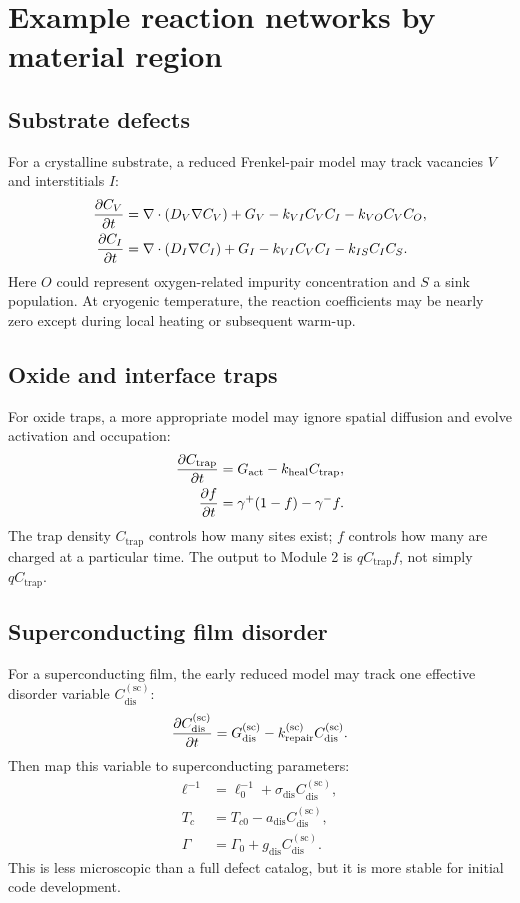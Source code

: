 \documentclass[11pt]{article}
\begin{document}
\section{Example reaction networks by material region}

\subsection{Substrate defects}

For a crystalline substrate, a reduced Frenkel-pair model may track vacancies $V$ and interstitials $I$:
\begin{align}
\pdv{C_V}{t}&=\nabla\cdot(D_V\nabla C_V)+G_V-k_{VI}C_VC_I-k_{VO}C_VC_O,\\
\pdv{C_I}{t}&=\nabla\cdot(D_I\nabla C_I)+G_I-k_{VI}C_VC_I-k_{IS}C_I C_S.
\end{align}
Here $O$ could represent oxygen-related impurity concentration and $S$ a sink population. At cryogenic temperature, the reaction coefficients may be nearly zero except during local heating or subsequent warm-up.

\subsection{Oxide and interface traps}

For oxide traps, a more appropriate model may ignore spatial diffusion and evolve activation and occupation:
\begin{align}
\pdv{C_{\mathrm{trap}}}{t}&=G_{\mathrm{act}}-k_{\mathrm{heal}}C_{\mathrm{trap}},\\
\pdv{f}{t}&=\gamma^+(1-f)-\gamma^- f.
\end{align}
The trap density $C_{\mathrm{trap}}$ controls how many sites exist; $f$ controls how many are charged at a particular time. The output to Module 2 is $qC_{\mathrm{trap}}f$, not simply $qC_{\mathrm{trap}}$.

\subsection{Superconducting film disorder}

For a superconducting film, the early reduced model may track one effective disorder variable $C_{\mathrm{dis}}^{(\mathrm{sc})}$:
\begin{equation}
\pdv{C_{\mathrm{dis}}^{(\mathrm{sc})}}{t}
=G_{\mathrm{dis}}^{(\mathrm{sc})}-k_{\mathrm{repair}}^{(\mathrm{sc})}C_{\mathrm{dis}}^{(\mathrm{sc})}.
\end{equation}
Then map this variable to superconducting parameters:
\begin{align}
\ell^{-1}&=\ell_0^{-1}+\sigma_{\mathrm{dis}} C_{\mathrm{dis}}^{(\mathrm{sc})},\\
T_c&=T_{c0}-a_{\mathrm{dis}}C_{\mathrm{dis}}^{(\mathrm{sc})},\\
\Gamma&=\Gamma_0+g_{\mathrm{dis}}C_{\mathrm{dis}}^{(\mathrm{sc})}.
\end{align}
This is less microscopic than a full defect catalog, but it is more stable for initial code development.
\end{document}
